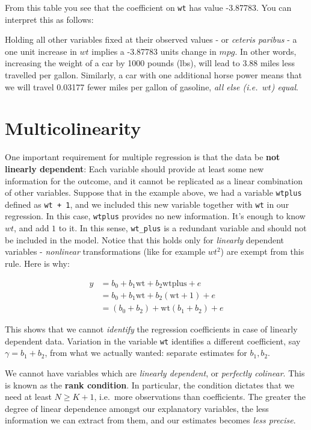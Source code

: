 \documentclass[]{book}
\newenvironment{note}{\begin{tcolorbox}[colback=blue!5!white,colframe=blue!75!black]}{\end{tcolorbox}}
\newenvironment{warning}{\begin{tcolorbox}[colback=orange!5!white,colframe=orange]}{\end{tcolorbox}}
\begin{document}
From this table you see that the coefficient on \texttt{wt} has value -3.87783. You can interpret this as follows:

\begin{warning}
Holding all other variables fixed at their observed values - or
\emph{ceteris paribus} - a one unit increase in \(wt\) implies a
-3.87783 units change in \(mpg\). In other words, increasing the weight
of a car by 1000 pounds (lbs), will lead to 3.88 miles less travelled
per gallon. Similarly, a car with one additional horse power means that
we will travel 0.03177 fewer miles per gallon of gasoline, \emph{all
else (i.e.~\(wt\)) equal}.
\end{warning}

\hypertarget{multicol}{%
\section{Multicolinearity}\label{multicol}}

One important requirement for multiple regression is that the data be \textbf{not linearly dependent}: Each variable should provide at least some new information for the outcome, and it cannot be replicated as a linear combination of other variables. Suppose that in the example above, we had a variable \texttt{wtplus} defined as \texttt{wt\ +\ 1}, and we included this new variable together with \texttt{wt} in our regression. In this case, \texttt{wtplus} provides no new information. It's enough to know \(wt\), and add \(1\) to it. In this sense, \texttt{wt\_plus} is a redundant variable and should not be included in the model. Notice that this holds only for \emph{linearly} dependent variables - \emph{nonlinear} transformations (like for example \(wt^2\)) are exempt from this rule. Here is why:

\begin{align}
y &= b_0 + b_1 \text{wt} + b_2 \text{wtplus} + e \\
  &= b_0 + b_1 \text{wt} + b_2 (\text{wt} + 1) + e \\
  &= (b_0 + b_2) + \text{wt} (b_1 + b_2) + e
\end{align}

This shows that we cannot \emph{identify} the regression coefficients in case of linearly dependent data. Variation in the variable \texttt{wt} identifies a different coefficient, say \(\gamma = b_1 + b_2\), from what we actually wanted: separate estimates for \(b_1,b_2\).

\begin{note}
We cannot have variables which are \emph{linearly dependent}, or
\emph{perfectly colinear}. This is known as the \textbf{rank condition}.
In particular, the condition dictates that we need at least
\(N \geq K+1\), i.e.~more observations than coefficients. The greater
the degree of linear dependence amongst our explanatory variables, the
less information we can extract from them, and our estimates becomes
\emph{less precise}.
\end{note}
\end{document}
